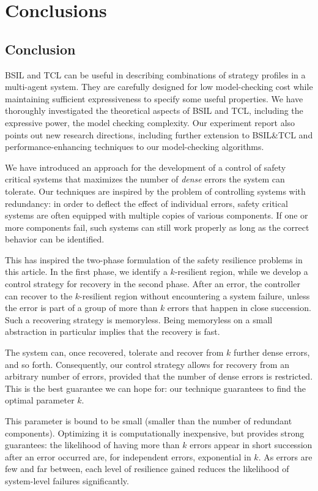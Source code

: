 \chapter{Conclusions}
\label{c:conclusions}
\section{Conclusion}
BSIL and TCL can be useful in describing combinations of strategy profiles in a multi-agent
system. 
They are carefully designed for low model-checking cost while maintaining sufficient expressiveness to specify some useful properties.
We have thoroughly investigated the theoretical aspects of BSIL and TCL, including the expressive power, the model checking complexity.
Our experiment report also points out new research directions, including further extension to BSIL\&TCL and performance-enhancing techniques to our model-checking algorithms.

We have introduced an approach for the development of a control of safety critical systems that maximizes the number of \emph{dense} errors the system can tolerate.
Our techniques are inspired by the problem of controlling systems with redundancy:
in order to deflect the effect of individual errors, safety critical systems are often equipped with multiple copies of various components.
If one or more components fail, such systems can still work properly as long as the correct behavior can be identified.
 
This has inspired the two-phase formulation of the safety resilience problems in this article.
In the first phase, we identify a $k$-resilient region, while we develop a control strategy for recovery in the second phase.  
After an error, the controller can recover to the $k$-resilient region without encountering a system failure, unless the error is part of a group of more than $k$ errors that happen in close succession.
Such a recovering strategy is memoryless.
Being memoryless on a small abstraction in particular implies that the recovery is fast.

The system can, once recovered, tolerate and recover from $k$ further dense errors, and so forth.
Consequently, our control strategy allows for recovery from an arbitrary
number of errors, provided that the number of dense errors is restricted.
This is the best guarantee we can hope for: our technique guarantees to find the optimal parameter $k$.

This parameter is bound to be small (smaller than the number of redundant components).
Optimizing it is computationally inexpensive, but provides strong guarantees: the likelihood of having more than $k$ errors appear in short succession after an error occurred are, for independent errors, exponential in $k$. As errors are few and far between, each level of resilience gained reduces the likelihood of 
system-level failures significantly.